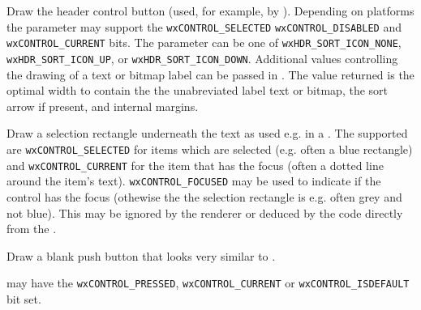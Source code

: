 
Draw the header control button (used, for example, by
).  Depending on platforms the
 parameter may support the \texttt{wxCONTROL\_SELECTED}
\texttt{wxCONTROL\_DISABLED} and \texttt{wxCONTROL\_CURRENT} bits.
The  parameter can be one of
\texttt{wxHDR\_SORT\_ICON\_NONE}, \texttt{wxHDR\_SORT\_ICON\_UP}, or
\texttt{wxHDR\_SORT\_ICON\_DOWN}.  Additional values controlling the
drawing of a text or bitmap label can be passed in .  The
value returned is the optimal width to contain the the unabreviated
label text or bitmap, the sort arrow if present, and internal margins.



\label{wxrenderernativedrawitemselectionrect}


Draw a selection rectangle underneath the text as used e.g. in a 
. The supported  are
\texttt{wxCONTROL\_SELECTED} for items which are selected (e.g. often a blue
rectangle) and \texttt{wxCONTROL\_CURRENT} for the item that has the focus
(often a dotted line around the item's text). \texttt{wxCONTROL\_FOCUSED} may
be used to indicate if the control has the focus (othewise the the selection
rectangle is e.g. often grey and not blue). This may be ignored by the renderer
or deduced by the code directly from the .


\label{wxrenderernativedrawpushbutton}


Draw a blank push button that looks very similar to .

 may have the \texttt{wxCONTROL\_PRESSED}, \texttt{wxCONTROL\_CURRENT} or
\texttt{wxCONTROL\_ISDEFAULT} bit set.


\label{wxrenderernativedrawsplitterborder}

